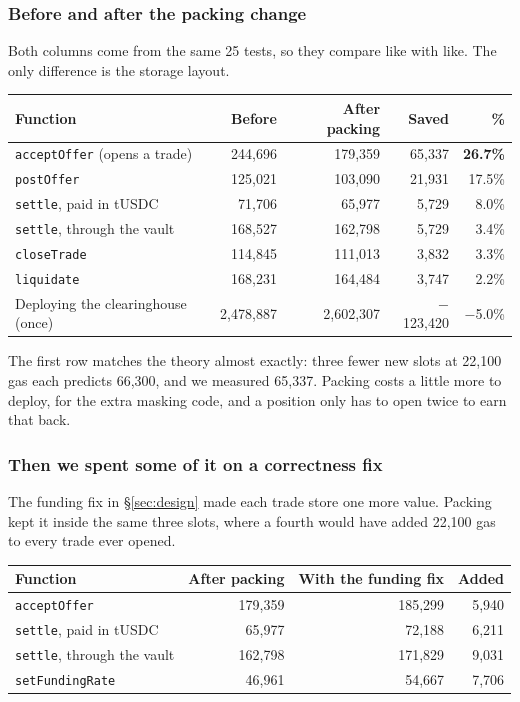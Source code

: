 \documentclass[11pt,a4paper]{article}
\begin{document}
\subsubsection*{Before and after the packing change}

Both columns come from the same 25 tests, so they compare like with like. The only difference is the
storage layout.

\begin{center}
\small
\begin{tabular}{@{}lrrrr@{}}
\toprule
\textbf{Function} & \textbf{Before} & \textbf{After packing} & \textbf{Saved} & \textbf{\%} \\
\midrule
\texttt{acceptOffer} (opens a trade) & 244,696 & 179,359 & 65,337 & \textbf{26.7\%} \\
\texttt{postOffer} & 125,021 & 103,090 & 21,931 & 17.5\% \\
\texttt{settle}, paid in tUSDC & 71,706 & 65,977 & 5,729 & 8.0\% \\
\texttt{settle}, through the vault & 168,527 & 162,798 & 5,729 & 3.4\% \\
\texttt{closeTrade} & 114,845 & 111,013 & 3,832 & 3.3\% \\
\texttt{liquidate} & 168,231 & 164,484 & 3,747 & 2.2\% \\
Deploying the clearinghouse (once) & 2,478,887 & 2,602,307 & $-$123,420 & $-$5.0\% \\
\bottomrule
\end{tabular}
\end{center}

The first row matches the theory almost exactly: three fewer new slots at 22,100 gas each predicts
66,300, and we measured 65,337. Packing costs a little more to deploy, for the extra masking code,
and a position only has to open twice to earn that back.

\subsubsection*{Then we spent some of it on a correctness fix}

The funding fix in \S\ref{sec:design} made each trade store one more value. Packing kept it inside
the same three slots, where a fourth would have added 22,100 gas to every trade ever opened.

\begin{center}
\small
\begin{tabular}{@{}lrrr@{}}
\toprule
\textbf{Function} & \textbf{After packing} & \textbf{With the funding fix} & \textbf{Added} \\
\midrule
\texttt{acceptOffer} & 179,359 & 185,299 & 5,940 \\
\texttt{settle}, paid in tUSDC & 65,977 & 72,188 & 6,211 \\
\texttt{settle}, through the vault & 162,798 & 171,829 & 9,031 \\
\texttt{setFundingRate} & 46,961 & 54,667 & 7,706 \\
\bottomrule
\end{tabular}
\end{center}
\end{document}
